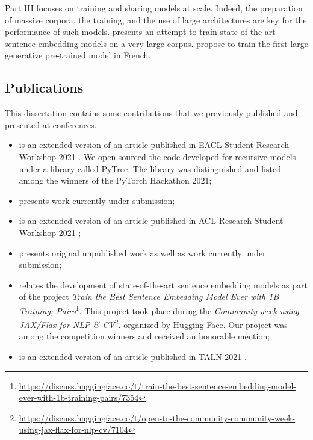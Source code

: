 Part III focuses on training and sharing models at scale. Indeed, the preparation of massive corpora, the training, and the use of large architectures are key for the performance of such models.  presents an attempt to train state-of-the-art sentence embedding models on a very large corpus.  propose to train the first large generative pre-trained model in French.

\subsection{Publications}

This dissertation contains some contributions that we previously published and presented at conferences.

\begin{itemize}
    \item {} is an extended version of an article published in EACL Student Research Workshop 2021 \parencite{simoulin_2021a}. We  open-sourced the code developed for recursive models under a library called PyTree. The library was distinguished and listed among the winners of the PyTorch Hackathon 2021;
    \item {} presents work currently under submission;
    \item {} is an extended version of an article published in ACL Research Student Workshop 2021 \parencite{simoulin_2021b};
    \item {} presents original unpublished work as well as work currently under submission;
    \item {} relates the development of state-of-the-art sentence embedding models as part of the project \textit{Train the Best Sentence Embedding Model Ever with 1B Training; Pairs}\footnote{\url{https://discuss.huggingface.co/t/train-the-best-sentence-embedding-model-ever-with-1b-training-pairs/7354}}. This project took place during the \textit{Community week using JAX/Flax for NLP \& CV}\footnote{\url{https://discuss.huggingface.co/t/open-to-the-community-community-week-using-jax-flax-for-nlp-cv/7104}}. organized by Hugging Face. Our project was among the competition winners and received an honorable mention;
    \item {} is an extended version of an article published in TALN 2021 \parencite{simoulin_2021c}.
\end{itemize}

